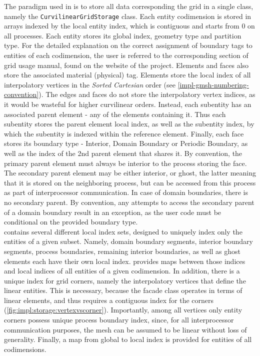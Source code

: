 \noindent
The paradigm used in \curvgrid{} is to store all data corresponding the grid in a single class, namely the \lstinline|CurvilinearGridStorage| class. Each entity codimension is stored in arrays indexed by the local entity index, which is contiguous and starts from 0 on all processes. Each entity stores its global index, geometry type and partition type. For the detailed explanation on the correct assignment of boundary tags to entities of each codimension, the user is referred to the corresponding section of \dune{} grid usage manual, found on the website of the project. Elements and faces also store the associated material (physical) tag. Elements store the local index of all interpolatory vertices in the \textit{Sorted Cartesian} order (see \cref{impl-gmsh-numbering-convention}). The edges and faces do not store the interpolatory vertex indices, as it would be wasteful for higher curvilinear orders. Instead, each subentity has an associated parent element - any of the elements containing it. Thus each subentity stores the parent element local index, as well as the subentity index, by which the subentity is indexed within the reference element. Finally, each face stores its boundary type - Interior, Domain Boundary or Periodic Boundary, as well as the index of the 2nd parent element that shares it. By convention, the primary parent element must always be interior to the process storing the face. The secondary parent element may be either interior, or ghost, the latter meaning that it is stored on the neighboring process, but can be accessed from this process as part of interprocessor communication. In case of domain boundaries, there is no secondary parent. By convention, any attempts to access the secondary parent of a domain boundary result in an exception, as the user code must be conditional on the provided boundary type. \\

\noindent
\curvgrid{} contains several different local index sets, designed to uniquely index only the entities of a given subset. Namely, domain boundary segments, interior boundary segments, process boundaries, remaining interior boundaries, as well as ghost elements each have their own local index. \curvgrid{} provides maps between those indices and local indices of all entities of a given codimension. In addition, there is a unique index for grid corners, namely the interpolatory vertices that define the linear entities. This is necessary, because the \dune{} facade class operates in terms of linear elements, and thus requires a contiguous index for the corners (\cref{fig:impl:storage:vertexvscorner}). Importantly, among all vertices only entity corners possess unique process boundary index, since, for all interprocessor communication purposes, the mesh can be assumed to be linear without loss of generality. Finally, a map from global to local index is provided for entities of all codimensions. \\

